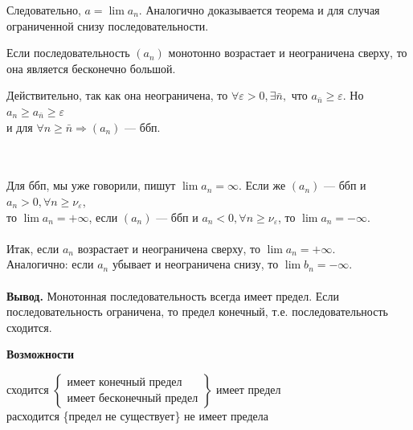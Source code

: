 Следовательно, $a=\lim a_n$. Аналогично доказывается теорема и для случая ограниченной снизу последовательности.
\begin{theorem}
	Если последовательность $(a_n)$ монотонно возрастает и неограничена сверху, то она является бесконечно большой.
\end{theorem}
\begin{Proof}
	Действительно, так как она неограничена, то $\forall\varepsilon > 0,\exists\bar n ,$ что $a_{\bar n}\geqslant\varepsilon$. Но $a_n \geqslant a_{\bar n}\geqslant\varepsilon$\\
	и для $\forall n \geqslant \bar n \Rightarrow (a_n)$ --- ббп.
\end{Proof}\\\\
Для ббп, мы уже говорили, пишут $\lim a_n = \infty$. Если же $(a_n)$ --- ббп и $a_n>0,\forall n \geqslant \nu_\varepsilon$,\\
то $\lim a_n = +\infty$, если $(a_n)$ --- ббп и $a_n < 0,\forall n \geqslant \nu_\varepsilon$, то $\lim a_n = -\infty$.\\\\
Итак, если $a_n$ возрастает и неограничена сверху, то $\lim a_n = +\infty$.\\
Аналогично: если $a_n$ убывает и неограничена снизу, то $\lim b_n = -\infty$.\\\\
\textbf{Вывод.} Монотонная последовательность всегда имеет предел. Если последовательность ограничена, то предел конечный, т.е. последовательность сходится.
\begin{center}
	\textbf{Возможности}
\end{center}
\begin{center}
	сходится $\left\{\begin{gathered}
		\text{имеет конечный предел}\\
		\text{имеет бесконечный предел}
	\end{gathered}\right\}$ имеет предел\\
	расходится \{предел не существует\} не имеет предела
\end{center}

